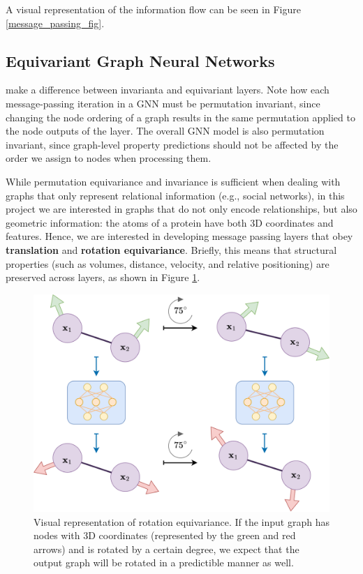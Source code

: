 A visual representation of the information flow can be seen in Figure \ref{message_passing_fig}.

\subsection{Equivariant Graph Neural Networks}
{\color{red} make a difference between invarianta and equivariant layers. }Note how each message-passing iteration in a GNN must be permutation invariant, since changing the node ordering of a graph results in the same permutation applied to the node outputs of the layer. 
The overall GNN model is also permutation invariant, since graph-level property predictions should not be affected by the order we assign to nodes when processing them.

While permutation equivariance and invariance is sufficient when dealing with graphs that only represent relational information (e.g., social networks), in this project we are interested in graphs that do not only encode relationships, but also geometric information: the atoms of a protein have both 3D coordinates and features.
Hence, we are interested in developing message passing layers that obey \textbf{translation} and \textbf{rotation equivariance}. Briefly, this means that structural properties (such as volumes, distance, velocity, and relative positioning) are preserved across layers, as shown in Figure \ref{equivariance}. 
\begin{figure}
    \centering
    \includegraphics[scale=0.7]{figures/equivariance-2.png}
    \caption{Visual representation of rotation equivariance. If the input graph has nodes with 3D coordinates (represented by the green and red arrows) and is rotated by a certain degree, we expect that the output graph will be rotated in a predictible manner as well.}
    \label{equivariance}
\end{figure}

